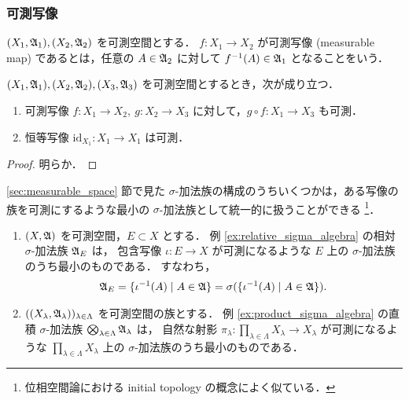 \subsubsection{可測写像}

\begin{definition}
    $(X_1,\mathfrak{A}_1),(X_2,\mathfrak{A}_2)$ を可測空間とする．
    $f:X_1\to X_2$ が可測写像 (measurable map) であるとは，任意の $A\in\mathfrak{A}_2$ に対して $f^{-1}(A)\in\mathfrak{A}_1$ となることをいう．
\end{definition}

\begin{proposition}\label{prop:Meas_prop}
    $(X_1,\mathfrak{A}_1),(X_2,\mathfrak{A}_2),(X_3,\mathfrak{A}_3)$ を可測空間とするとき，次が成り立つ．
    \begin{enumerate}
        \item 可測写像 $f:X_1\to X_2,\ g:X_2\to X_3$ に対して，$g\circ f:X_1\to X_3$ も可測．
        \item 恒等写像 $\mathrm{id}_{X_1}:{X_1}\to{X_1}$ は可測．
    \end{enumerate}
\end{proposition}

\begin{proof}
    明らか．
\end{proof}

\begin{example}\label{ex:initial_sigma_algebra}
    \ref{sec:measurable_space} 節で見た $\sigma$-加法族の構成のうちいくつかは，ある写像の族を可測にするような最小の $\sigma$-加法族として統一的に扱うことができる
    \footnote{位相空間論における initial topology の概念によく似ている．}．
    \begin{enumerate}
        \item
            $(X,\mathfrak{A})$ を可測空間，$E\subset X$ とする．
            例 \ref{ex:relative_sigma_algebra} の相対 $\sigma$-加法族 $\mathfrak{A}_E$ は，
            包含写像 $\iota:E\to X$ が可測になるような $E$ 上の $\sigma$-加法族のうち最小のものである．
            すなわち，
            \begin{align*}
                \mathfrak{A}_E
                =\{\iota^{-1}(A)\mid A\in\mathfrak{A}\}
                =\sigma(\{\iota^{-1}(A)\mid A\in\mathfrak{A}\}).
            \end{align*}
        \item
            $((X_\lambda,\mathfrak{A}_\lambda))_{\lambda\in\Lambda}$ を可測空間の族とする．
            例 \ref{ex:product_sigma_algebra} の直積 $\sigma$-加法族 $\bigotimes_{\lambda\in\Lambda}\mathfrak{A}_\lambda$ は，
            自然な射影 $\pi_\lambda:\prod_{\lambda\in\Lambda}X_\lambda\to X_\lambda$ が可測になるような
            $\prod_{\lambda\in\Lambda}X_\lambda$ 上の $\sigma$-加法族のうち最小のものである．
        \end{enumerate}
\end{example}

